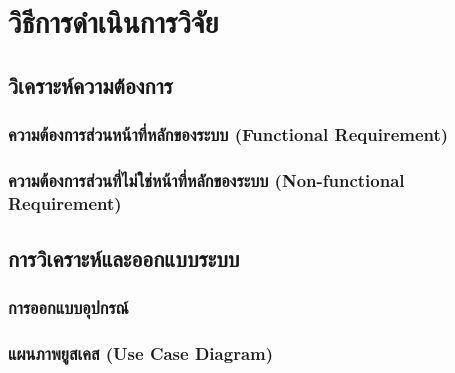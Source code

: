 \chapter{วิธีการดำเนินการวิจัย}
\label{chapter:experiment}

\section{วิเคราะห์ความต้องการ}
\subsection{ความต้องการส่วนหน้าที่หลักของระบบ (Functional Requirement)}

\subsection{ความต้องการส่วนที่ไม่ใช่หน้าที่หลักของระบบ (Non-functional Requirement)}

\section{การวิเคราะห์และออกแบบระบบ}
\subsection{การออกแบบอุปกรณ์}

\subsection{แผนภาพยูสเคส (Use Case Diagram)}
